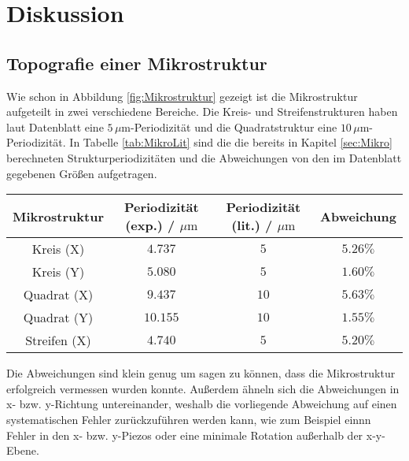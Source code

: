 \section{Diskussion}    
    \subsection{Topografie einer Mikrostruktur}
        Wie schon in Abbildung \ref{fig:Mikrostruktur} gezeigt ist die Mikrostruktur aufgeteilt in zwei verschiedene Bereiche. Die Kreis- und Streifenstrukturen haben laut Datenblatt eine $5\,\mu\text{m}$-Periodizität und die Quadratstruktur eine $10\,\mu\text{m}$-Periodizität. In Tabelle \ref{tab:MikroLit} sind die die bereits in Kapitel \ref{sec:Mikro} berechneten Strukturperiodizitäten und die Abweichungen von den im Datenblatt gegebenen Größen aufgetragen.
        \begin{center}
            \label{tab:MikroLit}
            \begin{tabular}{c c c c}
                \toprule
                Mikrostruktur & Periodizität (exp.) / $\mu\text{m}$ & Periodizität (lit.) / $\mu\text{m}$ & Abweichung\\
                \midrule
                Kreis (X)   & $4.737$  & $5$ & $5.26\%$ \\
                Kreis (Y)   & $5.080$  & $5$ & $1.60\%$ \\
                Quadrat (X) & $9.437$  & $10$& $5.63\%$ \\
                Quadrat (Y) & $10.155$ & $10$& $1.55\%$ \\
                Streifen (X)& $4.740$  & $5$ & $5.20\%$ \\
                \bottomrule
            \end{tabular}
        \end{center}
        Die Abweichungen sind klein genug um sagen zu können, dass die Mikrostruktur erfolgreich vermessen wurden konnte. Außerdem ähneln sich die Abweichungen in x- bzw. y-Richtung untereinander, weshalb die vorliegende Abweichung auf einen systematischen Fehler zurückzuführen werden kann, wie zum Beispiel einnn Fehler in den x- bzw. y-Piezos oder eine minimale Rotation außerhalb der x-y-Ebene.
        \FloatBarrier
